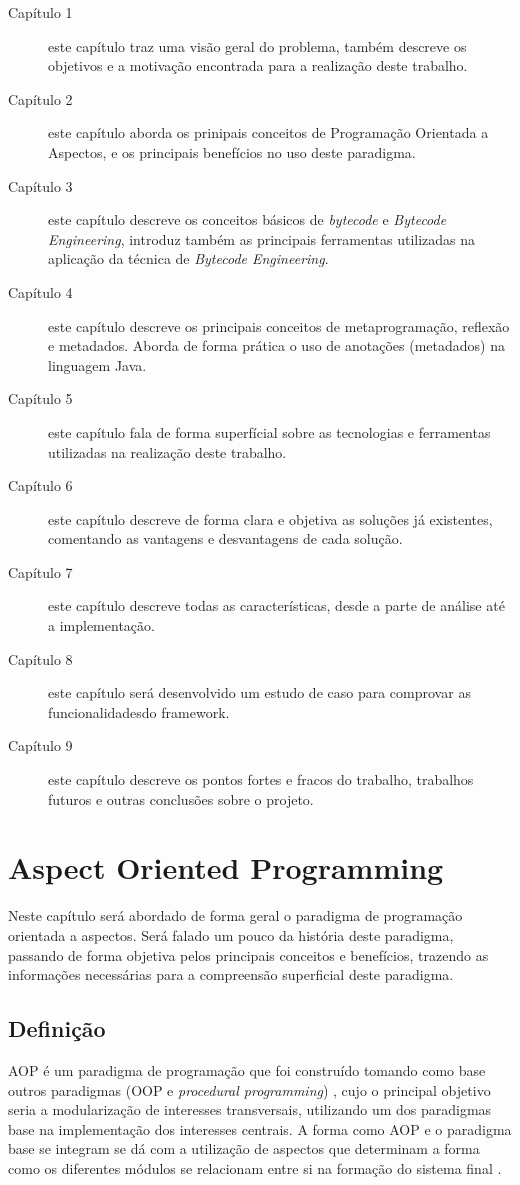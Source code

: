 \documentclass[tc,openright]{iiufrgs}
\begin{document}
\begin{description}
\item [Capítulo 1] este capítulo traz uma visão geral do problema, também descreve os objetivos e a motivação encontrada para a realização deste trabalho.
\item [Capítulo 2] este capítulo aborda os prinipais conceitos de Programação Orientada a Aspectos, e os principais benefícios no uso deste paradigma.
\item [Capítulo 3] este capítulo descreve os conceitos básicos de \textit{bytecode} e \textit{Bytecode Engineering}, introduz também as principais ferramentas utilizadas na aplicação da técnica de \textit{Bytecode Engineering}.
\item [Capítulo 4] este capítulo descreve os principais conceitos de metaprogramação, reflexão e metadados. Aborda de forma prática o uso de anotações (metadados) na linguagem Java.
\item [Capítulo 5] este capítulo fala de forma superfícial sobre as tecnologias e ferramentas utilizadas na realização deste trabalho.
\item [Capítulo 6] este capítulo descreve de forma clara e objetiva as soluções já existentes, comentando as vantagens e desvantagens de cada solução.
\item [Capítulo 7] este capítulo descreve todas as características, desde a parte de análise até a implementação.
\item [Capítulo 8] este capítulo será desenvolvido um estudo de caso para comprovar as funcionalidadesdo framework.
\item [Capítulo 9] este capítulo descreve os pontos fortes e fracos do trabalho, trabalhos futuros e outras conclusões sobre o projeto. 
\end{description}
 
\chapter{Aspect Oriented Programming}
Neste capítulo será abordado de forma geral o paradigma de programação orientada a aspectos. Será falado um pouco da história deste paradigma, passando de forma objetiva pelos principais conceitos e benefícios, trazendo as informações necessárias para a compreensão superficial deste paradigma.
\section{Definição}
AOP é um paradigma de programação que foi construído tomando como base outros paradigmas (OOP e \textit{procedural programming}) , cujo o principal objetivo seria a modularização de interesses transversais, utilizando um dos paradigmas base na implementação dos interesses centrais. A forma como AOP e o paradigma base se integram se dá com a utilização de aspectos que determinam a forma como os diferentes módulos se relacionam entre si na formação do sistema final \cite{laddad2003aspectj}.
\end{document}
